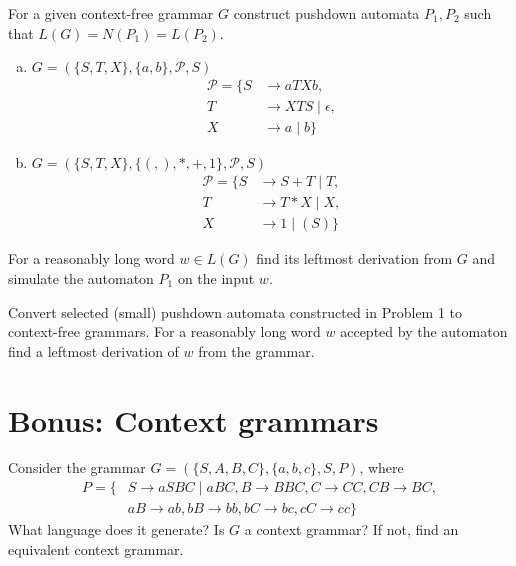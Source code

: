 \documentclass[a4paper,12pt]{amsart}
\begin{document}
\medskip\begin{problem}

    For a given context-free grammar $G$ construct pushdown automata $P_1,P_2$ such that $L(G)=N(P_1)=L(P_2)$.

    \bigskip

    \begin{enumerate}[(a)]\setlength\itemsep{12pt}
        \item $G=(\{S,T,X\},\{a,b\},\mathcal P,S)$
            \begin{align*}
        \mathcal P=\{S&\rightarrow aTXb, \\
        T&\rightarrow XTS\mid \epsilon,\\ 
        X&\rightarrow a\mid b\}
        \end{align*}
        \item $G=(\{S,T,X\},\{(,),*,+,1\},\mathcal P,S)$
            \begin{align*}
        \mathcal P=\{S&\rightarrow S+T\mid T, \\
        T&\rightarrow T*X\mid X,\\ 
        X&\rightarrow 1\mid (S)\}
        \end{align*}
    \end{enumerate}

    For a reasonably long word $w\in L(G)$ find its leftmost derivation from $G$ and simulate the automaton  $P_1$ on the input $w$.

\end{problem}
    

\medskip\begin{problem}

    Convert selected (small) pushdown automata constructed in Problem 1 to context-free grammars. For a reasonably long word $w$ accepted by the automaton find a leftmost derivation of $w$ from the grammar.

\end{problem}


\section*{Bonus: Context grammars}


\medskip\begin{problem}
    
    Consider the grammar $G=(\{S,A,B,C\},\{a,b,c\},S,P)$, where
    \begin{align*}
        P=\{&S\rightarrow aSBC\mid aBC, B\rightarrow BBC,  C\rightarrow CC, CB\rightarrow BC,\\ 
        &aB\rightarrow ab, bB\rightarrow bb, bC\rightarrow bc, cC\rightarrow cc\}
    \end{align*}
    What language does it generate? Is $G$ a context grammar? If not, find an equivalent context grammar.
    
\end{problem}
\end{document}
